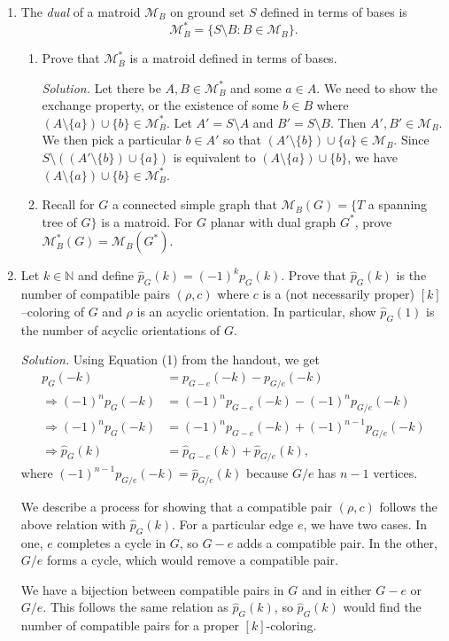 \documentclass[11pt,letterpaper]{article}
\newenvironment{solution}{\color{teal}\textit{Solution.}}{\color{black}}
\begin{document}
\begin{enumerate}
	\item The \emph{dual} of a matroid $\mathcal{M}_B$ on ground set $S$ defined in terms of bases is
	\[
	\mathcal{M}^*_B = \{S \setminus B: B \in \mathcal{M}_B\}. 
	\]
	\begin{enumerate}
	\item Prove that $\mathcal{M}^*_B$ is a matroid defined in terms of bases.
	
	\begin{solution}
		Let there be $A,B\in{\mathcal{M}^*_B}$ and some $a\in{A}$. We need to show the exchange property, or the existence of some $b\in{B}$ where $(A\setminus\{a\})\cup\{b\}\in{\mathcal{M}^*_B}$. Let $A'= S \setminus A$ and $B'= S \setminus B$. Then $A',B'\in{\mathcal{M}_B}$. We then pick a particular $b\in{A'}$ so that $(A'\setminus\{b\})\cup\{a\}\in{\mathcal{M}_B}$. Since $S\setminus ((A'\setminus\{b\})\cup\{a\})$ is equivalent to $(A\setminus\{a\})\cup\{b\}$, we have $(A\setminus\{a\})\cup\{b\}\in{\mathcal{M}^*_B}$.
	\end{solution}

	\item Recall for $G$ a connected simple graph that $\mathcal{M}_B(G) = \{T$ a spanning tree of $G\}$ is a matroid.
	For $G$ planar with dual graph $G^*$, prove $\mathcal{M}^*_B(G) = \mathcal{M}_B(G^*)$.
	\end{enumerate}
	
	\item Let $k \in \mathbb{N}$ and define $\hat{p}_G(k) = (-1)^kp_G(k)$. Prove that $\hat{p}_G(k)$ is the number of compatible pairs $(\rho,c)$ where $c$ is a (not necessarily proper) $[k]$--coloring  of $G$ and $\rho$ is an acyclic orientation. In particular, show $\hat{p}_G(1)$ is the number of acyclic orientations of $G$.
	
	\begin{solution}
		Using Equation (1) from the handout, we get
		\begin{align*}
			p_G(-k) &= p_{G-e}(-k)-p_{G/e}(-k) \\
			\Rightarrow (-1)^n p_G(-k) &= (-1)^n p_{G-e}(-k)- (-1)^n p_{G/e}(-k) \\
			\Rightarrow (-1)^n p_G(-k) &= (-1)^n p_{G-e}(-k)+(-1)^{n-1} p_{G/e}(-k) \\
			\Rightarrow \hat{p}_G(k) &= \hat{p}_{G-e}(k)+\hat{p}_{G/e}(k),
		\end{align*}
		where $(-1)^{n-1} p_{G/e}(-k)=\hat{p}_{G/e}(k)$ because $G/e$ has $n-1$ vertices.

		We describe a process for showing that a compatible pair $(\rho,c)$ follows the above relation with $\hat{p}_G(k)$. For a particular edge $e$, we have two cases. In one, $e$ completes a cycle in $G$, so $G-e$ adds a compatible pair. In the other, $G/e$ forms a cycle, which would remove a compatible pair.
		
		We have a bijection between compatible pairs in $G$ and in either $G-e$ or $G/e$. This follows the same relation as $\hat{p}_G(k)$, so $\hat{p}_G(k)$ would find the number of compatible pairs for a proper $[k]$-coloring.
	\end{solution}
	
\end{enumerate}
\end{document}
